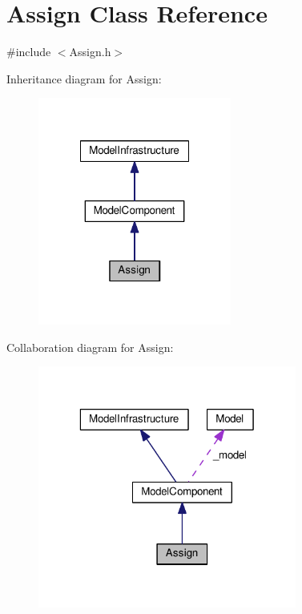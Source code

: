 \hypertarget{class_assign}{\section{Assign Class Reference}
\label{class_assign}
}


{\ttfamily \#include $<$Assign.\-h$>$}



Inheritance diagram for Assign\-:
\nopagebreak
\begin{figure}[H]
\begin{center}
\leavevmode
\includegraphics[width=180pt]{class_assign__inherit__graph}
\end{center}
\end{figure}


Collaboration diagram for Assign\-:
\nopagebreak
\begin{figure}[H]
\begin{center}
\leavevmode
\includegraphics[width=241pt]{class_assign__coll__graph}
\end{center}
\end{figure}
